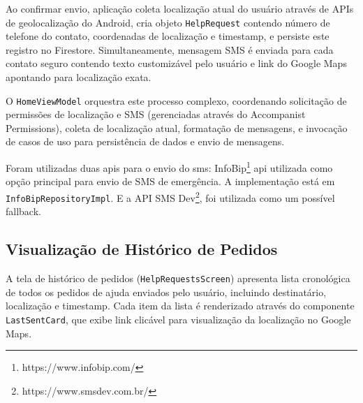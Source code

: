 Ao confirmar envio, aplicação coleta localização atual do usuário através de APIs de geolocalização do Android, cria objeto \texttt{HelpRequest} contendo número de telefone do contato, coordenadas de localização e timestamp, e persiste este registro no Firestore. Simultaneamente, mensagem SMS é enviada para cada contato seguro contendo texto customizável pelo usuário e link do Google Maps apontando para localização exata.

O \texttt{HomeViewModel} orquestra este processo complexo, coordenando solicitação de permissões de localização e SMS (gerenciadas através do Accompanist Permissions), coleta de localização atual, formatação de mensagens, e invocação de casos de uso para persistência de dados e envio de mensagens.

Foram utilizadas duas apis para o envio do sms: InfoBip\footnote{https://www.infobip.com/} api utilizada como opção principal para envio de SMS de emergência. A implementação está em \texttt{InfoBipRepositoryImpl}. E a API SMS Dev\footnote{https://www.smsdev.com.br/}, foi utilizada como um possível fallback.

\subsection{Visualização de Histórico de Pedidos}
A tela de histórico de pedidos (\texttt{HelpRequestsScreen}) apresenta lista cronológica de todos os pedidos de ajuda enviados pelo usuário, incluindo destinatário, localização e timestamp. Cada item da lista é renderizado através do componente \texttt{LastSentCard}, que exibe link clicável para visualização da localização no Google Maps.

